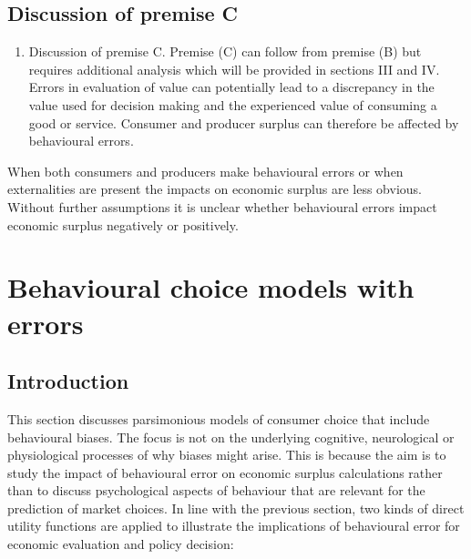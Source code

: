\documentclass[
]{book}
\providecommand{\tightlist}{%
  \setlength{\itemsep}{0pt}\setlength{\parskip}{0pt}}
\begin{document}
\hypertarget{discussion-of-premise-c}{%
\subsection{Discussion of premise C}\label{discussion-of-premise-c}}

\begin{enumerate}
\def\labelenumi{\Alph{enumi}.}
\setcounter{enumi}{3}
\tightlist
\item
  Discussion of premise C.
  Premise (C) can follow from premise (B) but requires additional analysis which will be provided in sections III and IV. Errors in evaluation of value can potentially lead to a discrepancy in the value used for decision making and the experienced value of consuming a good or service. Consumer and producer surplus can therefore be affected by behavioural errors.
\end{enumerate}

When both consumers and producers make behavioural errors or when externalities are present the impacts on economic surplus are less obvious. Without further assumptions it is unclear whether behavioural errors impact economic surplus negatively or positively.

\hypertarget{choicemodelserrors}{%
\section{Behavioural choice models with errors}\label{choicemodelserrors}}

\hypertarget{introduction-8}{%
\subsection{Introduction}\label{introduction-8}}

This section discusses parsimonious models of consumer choice that include behavioural biases. The focus is not on the underlying cognitive, neurological or physiological processes of why biases might arise. This is because the aim is to study the impact of behavioural error on economic surplus calculations rather than to discuss psychological aspects of behaviour that are relevant for the prediction of market choices. In line with the previous section, two kinds of direct utility functions are applied to illustrate the implications of behavioural error for economic evaluation and policy decision:
\end{document}
